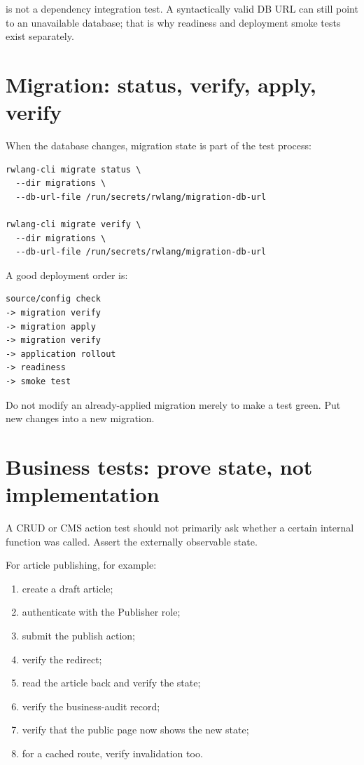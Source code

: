  is not a dependency integration test. A syntactically valid DB URL can still point to an unavailable database; that is why readiness and deployment smoke tests exist separately.

\section{Migration: status, verify, apply, verify}

When the database changes, migration state is part of the test process:

\begin{lstlisting}
rwlang-cli migrate status \
  --dir migrations \
  --db-url-file /run/secrets/rwlang/migration-db-url

rwlang-cli migrate verify \
  --dir migrations \
  --db-url-file /run/secrets/rwlang/migration-db-url
\end{lstlisting}

A good deployment order is:

\begin{lstlisting}
source/config check
-> migration verify
-> migration apply
-> migration verify
-> application rollout
-> readiness
-> smoke test
\end{lstlisting}

Do not modify an already-applied migration merely to make a test green. Put new changes into a new migration.

\section{Business tests: prove state, not implementation}

A CRUD or CMS action test should not primarily ask whether a certain internal function was called. Assert the externally observable state.

For article publishing, for example:

\begin{enumerate}
  \item create a draft article;
  \item authenticate with the Publisher role;
  \item submit the publish action;
  \item verify the redirect;
  \item read the article back and verify the  state;
  \item verify the business-audit record;
  \item verify that the public page now shows the new state;
  \item for a cached route, verify invalidation too.
\end{enumerate}

